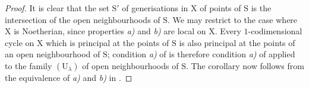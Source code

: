 \begin{proof}
It is clear that the set $\mathrm{S}'$ of generisations in $\mathrm{X}$ of points of $\mathrm{S}$ is the intersection of the open neighbourhoods of $\mathrm{S}$. We may restrict to the case where $\mathrm{X}$ is Noetherian, since properties \emph{a)} and \emph{b)} are local on $\mathrm{X}$. Every $1$-codimensional cycle on $\mathrm{X}$ which is principal at the points of $\mathrm{S}$ is also principal at the points of an open neighbourhood of $\mathrm{S}$; condition \emph{a)} of  is therefore condition \emph{a)} of  applied to the family $(\mathrm{U}_\lambda)$ of open neighbourhoods of $\mathrm{S}$. The corollary now follows from the equivalence of \emph{a)} and \emph{b)} in .
\end{proof}

